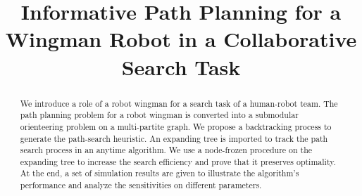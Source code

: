 \documentclass[conference]{IEEEtran}
\begin{document}
\title{Informative Path Planning for a Wingman Robot in a Collaborative Search Task}

\author{
}

\maketitle

\begin{abstract}
We introduce a role of a robot wingman for a search task of a human-robot team.
The path planning problem for a robot wingman is converted into a submodular orienteering problem on a multi-partite graph.
We propose a backtracking process to generate the path-search heuristic.
An expanding tree is imported to track the path search process in an anytime algorithm. 
We use a node-frozen procedure on the expanding tree to increase the search efficiency and prove that it preserves optimality.
At the end, a set of simulation results are given to illustrate the algorithm's performance and analyze the sensitivities on different parameters.
\end{abstract}

\IEEEpeerreviewmaketitle



















\end{document}

